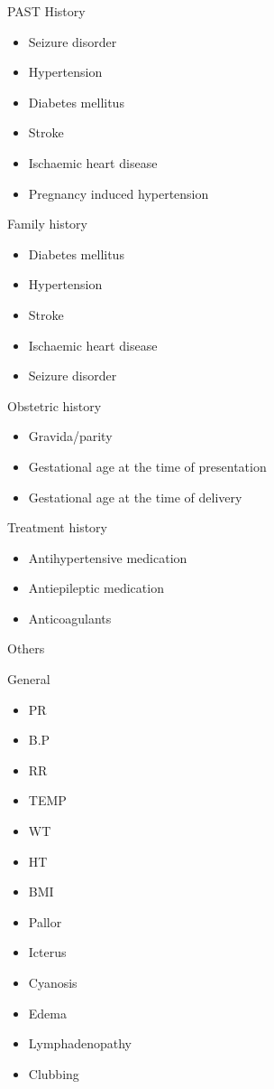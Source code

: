 \documentclass[14pt]{extarticle}
\begin{document}
PAST History

\begin{itemize}
\item  Seizure disorder
\item  Hypertension
\item  Diabetes mellitus
\item  Stroke
\item  Ischaemic heart disease
\item  Pregnancy induced hypertension
\end{itemize}	

Family history

\begin{itemize}
\item Diabetes mellitus
\item Hypertension
\item Stroke
\item Ischaemic heart disease
\item Seizure disorder
\end{itemize}

Obstetric history

\begin{itemize}
\item  Gravida/parity
\item  Gestational age at the time of presentation
\item  Gestational age at the time of delivery
\end{itemize}

Treatment history

\begin{itemize}
\item  Antihypertensive medication
\item  Antiepileptic medication
\item  Anticoagulants
\end{itemize}

Others

General

\begin{itemize}
\item PR
\item B.P
\item RR
\item TEMP
\item WT
\item HT
\item BMI
\item Pallor
\item Icterus
\item Cyanosis
\item Edema
\item Lymphadenopathy
\item Clubbing
\end{itemize}
\end{document}
